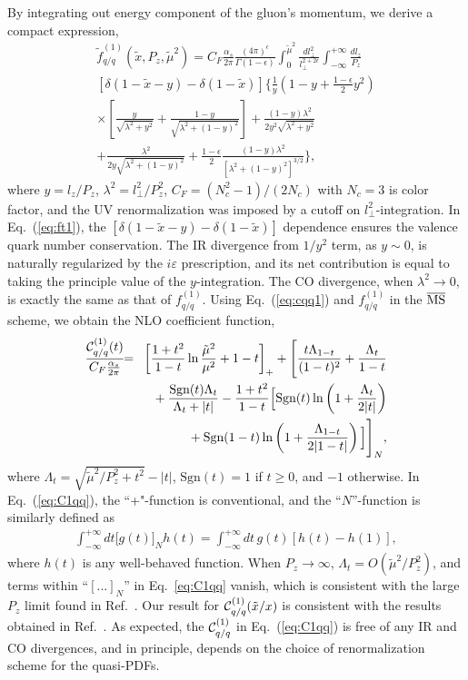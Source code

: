 \documentclass[twocolumn,aps,prl,superscriptaddress,nofootinbib,showpacs]{revtex4-1}
\newcommand{\nnu}{\nonumber\\}
\begin{document}
By integrating out energy component of the gluon's momentum, we derive a compact expression,
\begin{eqnarray}
\tilde{f}_{q/q}^{(1)}(\tilde{x}, P_z,\tilde{\mu}^2)
=C_F \frac{\alpha_s}{2\pi} \frac{(4\pi)^\epsilon}{\Gamma(1-\epsilon)}
\int_0^{\tilde{\mu}^2} \frac{d{l_\perp^2}}{l_\perp^{2+2\epsilon}}
\int_{-\infty}^{+\infty} \frac{dl_z}{P_z}
\nnu \left[ \delta\left(1-\tilde{x}-y\right) - \delta\left(1-\tilde{x}\right) \right] \Bigg\{ \frac{1}{y}
\left(1-y + \frac{1-\epsilon}{2}y^2\right) \nnu \times\left[\frac{y}{\sqrt{\lambda^2+y^2}}+\frac{1-y}{\sqrt{\lambda^2+(1-y)^2}}\right]   + \frac{(1-y)\lambda^2}{2y^2 \sqrt{\lambda^2+y^2}} \nnu
  + \frac{\lambda^2}{2 y \sqrt{\lambda^2+(1-y)^2}}
+ \frac{1-\epsilon}{2} \frac{(1-y)\lambda^2}{\left[\lambda^2+(1-y)^2\right]^{3/2}} \Bigg\},
\label{eq:ft1}
\end{eqnarray}
where $y={l_z}/{P_z}$, $\lambda^2=l_\perp^2/P_z^2$,  $C_F=(N_c^2-1)/(2N_c)$ with $N_c=3$ is color factor, and the UV renormalization was imposed by a cutoff on $l_\perp^2$-integration.  In Eq.~(\ref{eq:ft1}), the $[\delta\left(1-\tilde{x}-y\right) - \delta\left(1-\tilde{x}\right)]$ dependence ensures the valence quark number conservation. The IR divergence from $1/y^2$ term, as $y\sim 0$, is naturally regularized by the $i\varepsilon$ prescription, and its net contribution is equal to taking the principle value of the $y$-integration.
The CO divergence, when $\lambda^2 \to 0$, is exactly the same as that of $f_{q/q}^{(1)}$.
Using Eq.~(\ref{eq:cqq1}) and $f_{q/q}^{(1)}$ in the $\overline{\rm MS}$ scheme, we obtain the NLO coefficient function,
\begin{eqnarray}\label{eq:C1}
\frac{{\cal C}_{q/q}^{(1)}({t})}{C_F \frac{\alpha_s}{2\pi}}
{\hskip -0.05in} &=& {\hskip -0.05in}
\left[\frac{1+{t}^2}{1-{t}} \ln\frac{\tilde{\mu}^2}{\mu^2} +1-{t}\right]_+
+ \Bigg[ \frac{t\Lambda_{1-{t}}}{(1-{t})^2}
+ \frac{\Lambda_{{t}}}{1-{t}}
\nnu
&\ & {\hskip -0.2in} +
\frac{ \text{Sgn}({t})\Lambda_{{t}}}{\Lambda_{{t}}+|{t}|}
- \frac{1+{t}^2}{1-{t}} \Big[ \text{Sgn}({t})\ln\left(1+\frac{\Lambda_{{t}}}{2|{t}|}\right)
\nnu
&\ & {\hskip -0.2in}
+ \text{Sgn}(1-{t}) \ln\left(1+\frac{\Lambda_{1-{t}}}{2|1-{t}|}\right) \Big]
 \Bigg]_N,
\label{eq:C1qq}
\end{eqnarray}
where $\Lambda_t=\sqrt{\tilde{\mu}^2/P_z^2 + t^2}-|t|$, $\text{Sgn}(t)=1$ if $t\ge 0$, and $-1$ otherwise.  In Eq.~(\ref{eq:C1qq}), the ``+"-function is conventional, and the ``$N$''-function is similarly defined as
\begin{eqnarray}
\int_{-\infty}^{+\infty} d{t} \Big[ g({t})\Big]_N h({t}) =  \int_{-\infty}^{+\infty} d{t}\, g({t}) \left[ h({t}) -h(1)\right],
\end{eqnarray}
where $h({t})$ is any well-behaved function.  When $P_z \to \infty$, $\Lambda_{t} = { O}(\tilde{\mu}^2/P_z^2)$, and terms within ``$[...]_N$'' in Eq.~\eqref{eq:C1qq} vanish, which is consistent with the large $P_z$ limit found in Ref.~\cite{Ji:2013dva}.  Our result for ${\cal C}_{q/q}^{(1)}(\tilde{x}/x)$ is consistent with the results obtained in Ref.~\cite{Xiong:2013bka}. As expected, the ${\cal C}_{q/q}^{(1)}$ in Eq.~(\ref{eq:C1qq}) is free of any IR and CO divergences, and in principle, depends on the choice of renormalization scheme for the quasi-PDFs.
\end{document}
